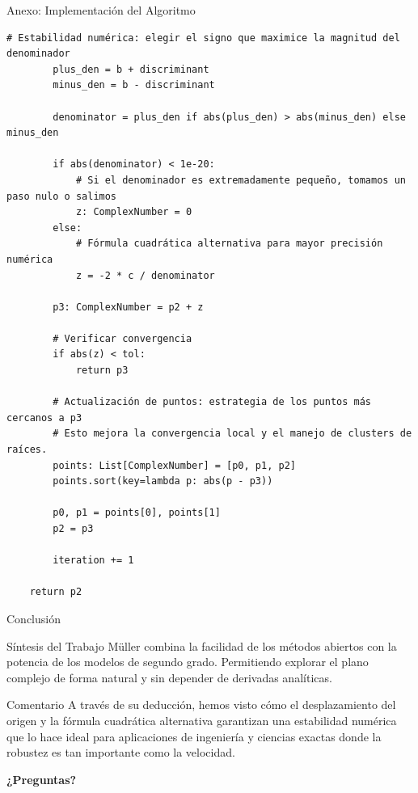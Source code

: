 \documentclass[aspectratio=169, t]{beamer}
\begin{document}
\begin{frame}{Anexo: Implementación del Algoritmo}
\begin{lstlisting}[style=mullerpython]
        # Estabilidad numérica: elegir el signo que maximice la magnitud del denominador
        plus_den = b + discriminant
        minus_den = b - discriminant
        
        denominator = plus_den if abs(plus_den) > abs(minus_den) else minus_den
            
        if abs(denominator) < 1e-20:
            # Si el denominador es extremadamente pequeño, tomamos un paso nulo o salimos
            z: ComplexNumber = 0
        else:
            # Fórmula cuadrática alternativa para mayor precisión numérica
            z = -2 * c / denominator
            
        p3: ComplexNumber = p2 + z
        
        # Verificar convergencia
        if abs(z) < tol:
            return p3
            
        # Actualización de puntos: estrategia de los puntos más cercanos a p3
        # Esto mejora la convergencia local y el manejo de clusters de raíces.
        points: List[ComplexNumber] = [p0, p1, p2]
        points.sort(key=lambda p: abs(p - p3))
        
        p0, p1 = points[0], points[1]
        p2 = p3
        
        iteration += 1
        
    return p2
\end{lstlisting}
\end{frame}

\begin{frame}{Conclusión}
    \begin{concept}{Síntesis del Trabajo}
        Müller combina la facilidad de los métodos abiertos con la potencia de los modelos de segundo grado. Permitiendo explorar el plano complejo de forma natural y sin depender de derivadas analíticas.
    \end{concept}

    \vspace{0.2cm}
    \begin{mathstep}{Comentario}
        A través de su deducción, hemos visto cómo el desplazamiento del origen y la fórmula cuadrática alternativa garantizan una estabilidad numérica que lo hace ideal para aplicaciones de ingeniería y ciencias exactas donde la robustez es tan importante como la velocidad.
    \end{mathstep}
\end{frame}

\begin{frame}[plain]
    \begin{center}
        \vfill
        \Huge \textbf{\textcolor{MyRed}{¿Preguntas?}}
    \end{center}
\end{frame}
\end{document}
